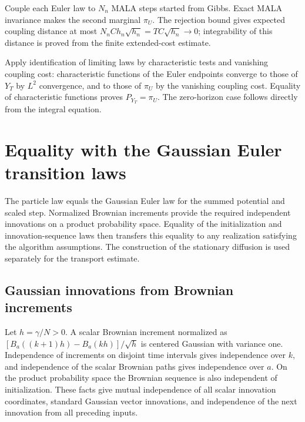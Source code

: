 \documentclass[11pt,a4paper]{article}
\begin{document}
Couple each Euler law to \(N_n\) MALA steps started from Gibbs. Exact MALA invariance makes the second marginal \(\pi_U\). The rejection bound gives expected coupling distance at most \(N_nC h_n\sqrt{h_n}=TC\sqrt{h_n}\to0\); integrability of this distance is proved from the finite extended-cost estimate.



Apply identification of limiting laws by characteristic tests and vanishing coupling cost: characteristic functions of the Euler endpoints converge to those of \(Y_T\) by \(L^2\) convergence, and to those of \(\pi_U\) by the vanishing coupling cost. Equality of characteristic functions proves \(P_{Y_T}=\pi_U\). The zero-horizon case follows directly from the integral equation.


\section{\texorpdfstring{Equality with the Gaussian Euler transition laws}{Equality with the Gaussian Euler transition laws}}


The particle law equals the Gaussian Euler law for the summed potential and scaled step. Normalized Brownian increments provide the required independent innovations on a product probability space. Equality of the initialization and innovation-sequence laws then transfers this equality to any realization satisfying the algorithm assumptions. The construction of the stationary diffusion is used separately for the transport estimate.


\subsection{\texorpdfstring{Gaussian innovations from Brownian increments}{Gaussian innovations from Brownian increments}}


Let \(h=\gamma/N>0\). A scalar Brownian increment normalized as \([B_a((k+1)h)-B_a(kh)]/\sqrt h\) is centered Gaussian with variance one. Independence of increments on disjoint time intervals gives independence over \(k\), and independence of the scalar Brownian paths gives independence over \(a\). On the product probability space the Brownian sequence is also independent of initialization. These facts give mutual independence of all scalar innovation coordinates, standard Gaussian vector innovations, and independence of the next innovation from all preceding inputs.
\end{document}
